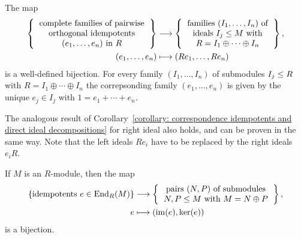 \begin{corollary}
  \label{corollary: correspondence idempotents and direct ideal decompositions}
  The map
  \begin{align*}
    \left\{
      \begin{tabular}{c}
        complete families of pairwise \\
        orthogonal idempotents  \\
        $(e_1, \dotsc, e_n)$ in $R$
      \end{tabular}
    \right\}
    &\longto
      \left\{
      \begin{tabular}{c}
        families $(I_1, \dotsc, I_n)$ of  \\
        ideals $I_j \moduleleq M$ with \\
        $R = I_1 \oplus \dotsb \oplus I_n$
      \end{tabular}
      \right\},
    \\
                  (e_1, \dotsc, e_n)
    &\longmapsto  (Re_1, \dotsc, Re_n)
  \end{align*}
  is a well-defined bijection.
  For every family $(I_1, \dotsc, I_n)$ of submodules $I_j \leq R$ with $R = I_1 \oplus \dotsb \oplus I_n$ the correpsonding family $(e_1, \dotsc, e_n)$ is given by the unique $e_j \in I_j$ with $1 = e_1 + \dotsb + e_n$.
\end{corollary}


\begin{remark}
  The analogous result of Corollary~\ref{corollary: correspondence idempotents and direct ideal decompositions} for right ideal also holds, and can be proven in the same way.
  Note that the left ideals $R e_i$ have to be replaced by the right ideals $e_i R$.
\end{remark}


\begin{corollary}
  If $M$ is an $R$-module, then the map
  \begin{align*}
    \{ \text{idempotents $e \in \End_R(M)$} \}
    &\longto
      \left\{
      \begin{tabular}{c}
        pairs $(N,P)$ of submodules \\
        $N, P \moduleleq M$ with $M = N \oplus P$
      \end{tabular}
      \right\},
    \\
                  e
    &\longmapsto  (\im(e), \ker(e))
  \end{align*}
  is a bijection.
\end{corollary}


